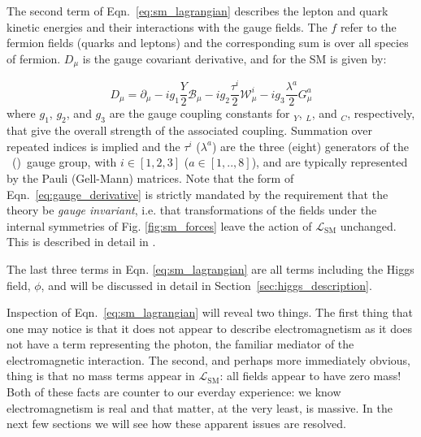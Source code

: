 The second term of Eqn.~\ref{eq:sm_lagrangian} describes the lepton and quark kinetic energies and their interactions with the gauge fields.
The $f$ refer to the fermion fields (quarks and leptons) and the corresponding sum is over all
species of fermion. $\mathit{D}_{\mu}$ is the gauge covariant derivative, and for the SM is
given by:

\begin{equation}
	\mathit{D}_{\mu} = \partial_{\mu} - i g_1 \frac{Y}{2} \mathcal{B}_{\mu} - i g_2 \frac{\tau^i}{2} \mathcal{W}_{\mu}^i - i g_3 \frac{\lambda^a}{2} G_{\mu}^a
	\label{eq:gauge_derivative}
\end{equation}
where $g_1$, $g_2$, and $g_3$ are the gauge coupling constants for \Uone$_{Y}$, \SUtwo$_{L}$, and \SUthree$_{C}$, respectively, that give the overall strength of the associated coupling.
Summation over repeated indices is implied and the $\tau^i$ ($\lambda^a$) are the three (eight)
generators of the \SUtwo~(\SUthree)~gauge group, with $i \in [1,2,3]$ ($a \in [1,..,8]$), and
are typically represented by the Pauli (Gell-Mann) matrices. Note that the form of Eqn.~\ref{eq:gauge_derivative} is strictly mandated by the requirement that the theory
be \textit{gauge invariant}, i.e. that transformations of the fields under the internal symmetries
of Fig. \ref{fig:sm_forces} leave the action of $\mathcal{L}_{\text{SM}}$ unchanged. This is described in detail
in {\color{red}{Appendix XXX}}.

The last three terms in Eqn. \ref{eq:sm_lagrangian} are all terms including the Higgs field, $\phi$,
and will be discussed in detail in Section~\ref{sec:higgs_description}.

Inspection of Eqn.~\ref{eq:sm_lagrangian} will reveal two things. The first thing that one
may notice is that it does not appear to describe electromagnetism as it does not have a
term representing the photon, the familiar mediator of the electromagnetic interaction.
The second, and perhaps more immediately obvious, thing is that no mass terms
appear in $\mathcal{L}_{\text{SM}}$: all fields appear to have zero mass! Both of these
facts are counter to our everday experience: we know electromagnetism is real and that matter,
at the very least, is massive. In the next few sections we will see how these apparent
issues are resolved.


\floatbarrier



